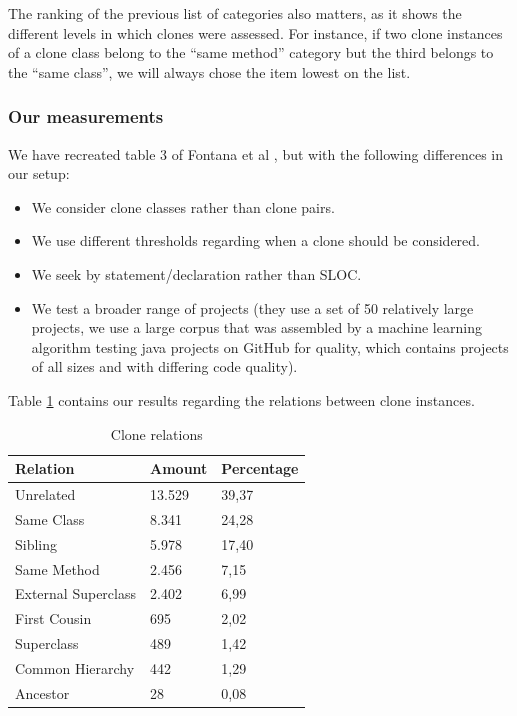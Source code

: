 \documentclass[a4paper]{article}
\begin{document}
The ranking of the previous list of categories also matters, as it shows the different levels in which clones were assessed. For instance, if two clone instances of a clone class belong to the ``same method'' category but the third belongs to the ``same class'', we will always chose the item lowest on the list.

\subsubsection{Our measurements}
We have recreated table 3 of Fontana et al \cite{fontana2015duplicated}, but with the following differences in our setup:
\begin{itemize}
  \item We consider clone classes rather than clone pairs.
\item We use different thresholds regarding when a clone should be considered.
\item We seek by statement/declaration rather than SLOC.
\item We test a broader range of projects (they use a set of 50 relatively large projects, we use a large corpus that was assembled by a machine learning algorithm testing java projects on GitHub for quality, which contains projects of all sizes and with differing code quality).
\end{itemize}

Table \ref{table:relations} contains our results regarding the relations between clone instances.

\begin{table}[H]
  \begin{center}
  \caption{Clone relations} \label{table:relations}
  \bigskip
\begin{tabular}{|l|l|l|} \hline
\textbf{Relation}  & \textbf{Amount} & \textbf{Percentage} \\ \hline
Unrelated          & 13.529           & 39,37               \\ \hline
Same Class          & 8.341            & 24,28               \\ \hline
Sibling            & 5.978            & 17,40               \\ \hline
Same Method         & 2.456            & 7,15                \\ \hline
External Superclass & 2.402            & 6,99                \\ \hline
First Cousin        & 695             & 2,02                \\ \hline
Superclass         & 489             & 1,42                \\ \hline
Common Hierarchy    & 442             & 1,29                \\ \hline
Ancestor           & 28              & 0,08               \\ \hline
\end{tabular}
\end{center}
\end{table}
\end{document}
